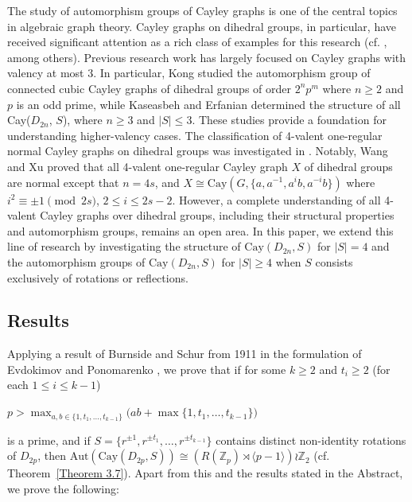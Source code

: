 \documentclass[12pt,reqno,a4paper]{amsart}
\theoremstyle{definition}
\begin{document}
The study of automorphism groups of Cayley graphs is one of the central topics in algebraic graph theory. Cayley graphs on dihedral groups, in particular, have received significant attention as a rich class of examples for this research  
(cf. \cite{KE2021,Kon2020,KO2006,WZ2006,WX2006,ZF2007}, among others). 
Previous research work has largely focused on
Cayley graphs with valency at most $3$. In particular, Kong \cite{Kon2020} studied the automorphism group of connected cubic Cayley graphs of dihedral groups of order $2^{n}p^{m}$ where $n\geq 2$ and $p$ is an odd prime, while
Kaseasbeh and Erfanian \cite{KE2021} determined the structure of all Cay($D_{2n}$, $S$), where $n \geq 3$ and $|S| \leq 3$.
These studies provide a foundation for understanding higher-valency cases.
The classification of 4-valent one-regular normal Cayley graphs on dihedral groups was  investigated in \cite{KO2006,WZ2006,WX2006}. Notably, Wang and Xu \cite{WX2006} 
proved that all 4-valent one-regular Cayley graph $X$ of dihedral groups are normal except that $n=4s$, and $X\cong \mathrm{Cay}(G,\{a,a^{-1}, a^{i}b,a^{-i}b\})$ where $i^{2}\equiv \pm 1\pmod {2s}$, $2\leq i\leq 2s-2$. However, a complete understanding of all 4-valent Cayley graphs over dihedral groups, including their structural properties and automorphism groups, remains an open area.
In this paper, we extend this line of research by investigating the structure of 
$\mathrm{Cay}(D_{2n},S)$ for $|S|=4$ and the automorphism 
groups of $\mathrm{Cay}(D_{2n},S)$ for $|S|\geq 4$ when $S$ consists exclusively of rotations or reflections. 


\subsection{Results} 


Applying a result of Burnside and Schur from 1911 in the formulation of Evdokimov and Ponomarenko \cite{EP2005}, we prove that 
if for some
$k\ge 2$ and $t_i \ge 2$ (for each $1\le i \le k-1$)
\begin{center}
$p > \max_{a,b\in\{1,t_1,\dots,t_{k-1}\}} \bigl(ab + \max\{1, t_1, \dots, t_{k-1}\}\bigr)$    
\end{center}
is a prime, and if 
$S=\{r^{\pm1}, r^{\pm t_1}, \dots, r^{\pm t_{k-1}}\}$
contains distinct non-identity rotations of $D_{2p}$, then 
$
\mathrm{Aut}(\mathrm{Cay}(D_{2p}, S))
    \cong (R(\mathbb{Z}_p) \rtimes \langle p-1 \rangle) \wr \mathbb{Z}_2 
$ (cf. Theorem~\ref{Theorem 3.7}).
Apart from this and the results stated in the Abstract, we prove the following:
\end{document}
